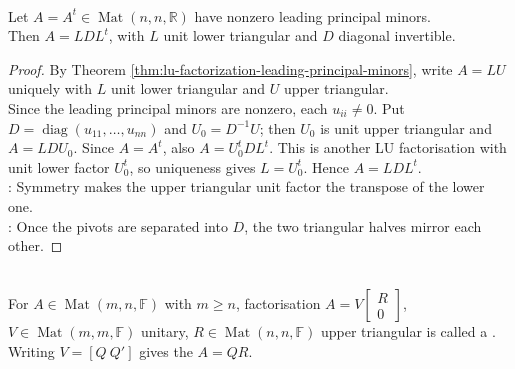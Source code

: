 \begin{corollary} \label{cor:symmetric-lu-gives-ldlt} \\
Let $A=A^t\in\operatorname{Mat}(n,n,\mathbb{R})$ have nonzero leading principal minors.\\
Then $A=LDL^t$, with $L$ unit lower triangular and $D$ diagonal invertible.
\begin{proof}
By Theorem \ref{thm:lu-factorization-leading-principal-minors}, write $A=LU$ uniquely with $L$ unit lower triangular and $U$ upper triangular.\\
Since the leading principal minors are nonzero, each $u_{ii}\neq0$. Put $D=\operatorname{diag}(u_{11},\ldots,u_{nn})$ and $U_0=D^{-1}U$; then $U_0$ is unit upper triangular and $A=LDU_0$. Since $A=A^t$, also $A=U_0^tDL^t$. This is another LU factorisation with unit lower factor $U_0^t$, so uniqueness gives $L=U_0^t$. Hence $A=LDL^t$.\\
: Symmetry makes the upper triangular unit factor the transpose of the lower one.\\
: Once the pivots are separated into $D$, the two triangular halves mirror each other.
\end{proof}
\end{corollary}

\begin{definition} \label{def:wide-and-narrow-qr-factorization} \\
For $A\in\operatorname{Mat}(m,n,\mathbb{F})$ with $m\geq n$, factorisation $A=V\begin{bmatrix}R\\0\end{bmatrix}$, $V\in\operatorname{Mat}(m,m,\mathbb{F})$ unitary, $R\in\operatorname{Mat}(n,n,\mathbb{F})$ upper triangular is called a . Writing $V=[Q\ Q']$ gives the  $A=QR$.
\end{definition}


